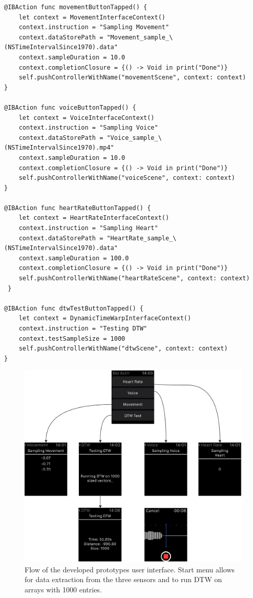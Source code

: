 \begin{lstlisting}[label={lst:ui}, caption={Spawning of ViewControllers from the
main interface, passing contexts setting up the sampling.},basicstyle=\small]
@IBAction func movementButtonTapped() {
    let context = MovementInterfaceContext()
    context.instruction = "Sampling Movement"
    context.dataStorePath = "Movement_sample_\(NSTimeIntervalSince1970).data"
    context.sampleDuration = 10.0
    context.completionClosure = {() -> Void in print("Done")}
    self.pushControllerWithName("movementScene", context: context)
}

@IBAction func voiceButtonTapped() {
    let context = VoiceInterfaceContext()
    context.instruction = "Sampling Voice"
    context.dataStorePath = "Voice_sample_\(NSTimeIntervalSince1970).mp4"
    context.sampleDuration = 10.0
    context.completionClosure = {() -> Void in print("Done")}
    self.pushControllerWithName("voiceScene", context: context)
}

@IBAction func heartRateButtonTapped() {
    let context = HeartRateInterfaceContext()
    context.instruction = "Sampling Heart"
    context.dataStorePath = "HeartRate_sample_\(NSTimeIntervalSince1970).data"
    context.sampleDuration = 100.0
    context.completionClosure = {() -> Void in print("Done")}
    self.pushControllerWithName("heartRateScene", context: context)
 }

@IBAction func dtwTestButtonTapped() {
    let context = DynamicTimeWarpInterfaceContext()
    context.instruction = "Testing DTW"
    context.testSampleSize = 1000
    self.pushControllerWithName("dtwScene", context: context)
}
\end{lstlisting}


\begin{figure}[!h]
\centering
\includegraphics[width=1.0\textwidth]{../media/bioswp_ui.pdf}
\caption{Flow of the developed prototypes user interface. Start menu allows for
data extraction from the three sensors and to run DTW on arrays with 1000
    entries.}
\label{fig:ui}
\end{figure}

